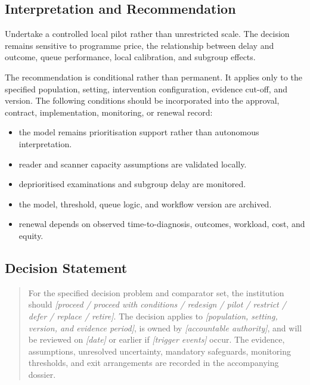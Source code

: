 \subsection{Interpretation and Recommendation}
Undertake a controlled local pilot rather than unrestricted scale. The decision remains sensitive to programme price, the relationship between delay and outcome, queue performance, local calibration, and subgroup effects.

The recommendation is conditional rather than permanent. It applies only to the
specified population, setting, intervention configuration, evidence cut-off, and
version. The following conditions should be incorporated into the approval,
contract, implementation, monitoring, or renewal record:

\begin{itemize}
 \item the model remains prioritisation support rather than autonomous interpretation.
 \item reader and scanner capacity assumptions are validated locally.
 \item deprioritised examinations and subgroup delay are monitored.
 \item the model, threshold, queue logic, and workflow version are archived.
 \item renewal depends on observed time-to-diagnosis, outcomes, workload, cost, and equity.
\end{itemize}

\subsection{Decision Statement}
\begin{quote}
For the specified decision problem and comparator set, the institution should
\emph{[proceed / proceed with conditions / redesign / pilot / restrict / defer /
replace / retire]}. The decision applies to \emph{[population, setting, version,
and evidence period]}, is owned by \emph{[accountable authority]}, and will be
reviewed on \emph{[date]} or earlier if \emph{[trigger events]} occur. The
evidence, assumptions, unresolved uncertainty, mandatory safeguards, monitoring
thresholds, and exit arrangements are recorded in the accompanying dossier.
\end{quote}
